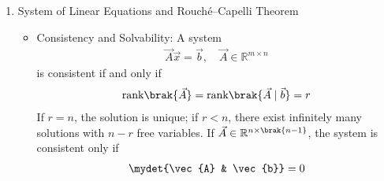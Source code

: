 \begin{enumerate}[label=\thesubsection.\arabic*, ref=\thesubsection.\theenumi,itemsep=0pt]
\begin{itemize}
\item Line Intersection and Solvability:
The lines $\vec{x} = \vec{A} + \kappa_1 \vec{m}_1$ and $\vec{x} = \vec{B} + \kappa_2 \vec{m}_2$ meet where:
\begin{align}
\myvec{\vec{m}_1 & -\vec{m}_2} \myvec{\kappa_1 \\ \kappa_2} = \vec{B} - \vec{A}
\label{eq:lineint} %
\end{align}
This system has a unique solution if and only if $\mydet{\vec{m}_1 & \vec{m}_2} \ne 0$. If the determinant is zero, the lines are parallel or coincident.

\item Angle Between Vectors:
The angle $\theta$ between two vectors $\vec{a}$ and $\vec{b}$ is given by:
\begin{align}
\cos\theta = \frac{\vec{a}^\top \vec{b}}{\norm{\vec{a}}\norm{\vec{b}}}
\label{eq:angle} %
\end{align}
Two vectors are orthogonal if and only if $\vec{a}^\top \vec{b} = 0$.

\item Circle Representation and Chords:
A point on a circle of radius $r$ centered at the origin is $\vec{x} = r \myvec{\cos\alpha \\ \sin\alpha}$ with $\vec{e}_\alpha \triangleq \myvec{\cos\alpha \\ \sin\alpha}$. The chord length between $\vec{x}_\alpha = r\vec{e}_\alpha$ and $\vec{x}_\beta = r\vec{e}_\beta$ satisfies:
\begin{align}
\vec{e}_\alpha^\top \vec{e}_\beta &= \cos\brak{\alpha - \beta} \label{eq:cosdiff} \\ %
\norm{\vec{x}_\alpha - \vec{x}_\beta}^2 &= 2r^2 \brak{1 - \vec{e}_\alpha^\top \vec{e}_\beta} = 4r^2 \sin^2 \frac{\alpha - \beta}{2}
\end{align}
\end{itemize}

\item System of Linear Equations and Rouch\'{e}--Capelli Theorem
\begin{itemize}
\item Consistency and Solvability:
A system
\begin{align} %
\vec{A}\vec{x} = \vec{b}, \quad \vec{A} \in \mathbb{R}^{m \times n}
\label{eq:axb} %
\end{align}
is consistent if and only if
\begin{align}
\text{rank}\brak{\vec{A}} = \text{rank}\brak{{\vec{A} \mid \vec{b}}} = r
\label{eq:rc} %
\end{align}
If $r = n$, the solution is unique; if $r < n$, there exist infinitely many solutions with $n - r$ free variables. If $\vec{A} \in \mathbb{R}^{n \times \brak{n-1}}$, the system is consistent only if
\begin{align} %
\mydet{\vec{A} & \vec{b}} = 0
\label{eq:augdet} %
\end{align}


\end{itemize}
\end{enumerate}
